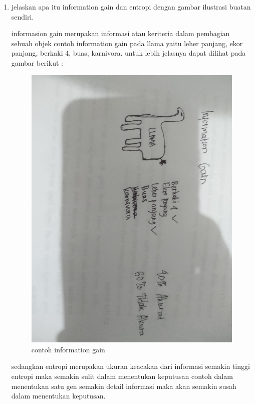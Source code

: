 \begin{enumerate}
\item jelaskan apa itu information gain dan entropi dengan gambar ilustrasi buatan sendiri.\par
informasion gain merupakan informasi atau keriteria dalam pembagian sebuah objek contoh information gain pada llama yaitu leher panjang, ekor panjang, berkaki 4, buas, karnivora. untuk lebih jelasnya dapat dilihat pada gambar berikut :\par
\begin{figure}[ht]
\centering
\includegraphics[scale=0.01]{figures/1174050/chapter2/9.jpg}
\caption{contoh information gain}
\label{contoh}
\end{figure}
sedangkan entropi merupakan ukuran keacakan dari informasi semakin tinggi entropi maka semakin sulit dalam menentukan keputusan contoh dalam menentukan satu gen semakin detail informasi maka akan semakin susah dalam menentukan keputusan.
\end{enumerate}








